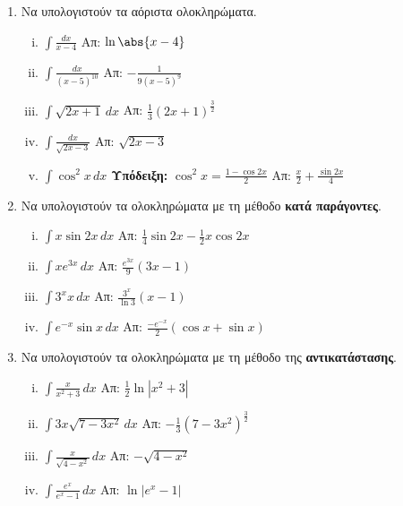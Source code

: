 \documentclass[a4paper,table]{report}
\begin{document}
\begin{center}
  \minibox{{\bfseries \large \textcolor{Col1}{Ασκήσεις στα Ολοκληρώματα}}}
\end{center}

\vspace{\baselineskip}


\begin{enumerate}
  \item Να υπολογιστούν τα αόριστα ολοκληρώματα.
    \begin{enumerate}[i)]
      \item $ \int \frac{dx}{x-4}$ \hfill Απ: $ \ln{\abs{x-4}} $ 
      \item $\int\frac{dx}{(x-5)^{10}} $ \hfill Απ: $-\frac{1}{9(x-5)^9}$
      \item $ \int \sqrt{ 2x+1 } \,{dx} $ \hfill Απ: 
        $ \frac{ 1 }{ 3 } (2x+1)^{\frac{ 3 }{ 2 } } $
      \item $ \int\frac{dx}{\sqrt{2x-3}}$ \hfill Απ: $ \sqrt{2x-3} $
      \item $\int\cos^2x \, dx$ \quad
        \textcolor{Col1}{\textbf{Υπόδειξη:}} $ \cos^{2}{x} = \frac{1- \cos{2x}}{2} $
        \hfill Απ: $\frac{x}{2} + \frac{\sin2x}{4}$
    \end{enumerate}

  \item Να υπολογιστούν τα ολοκληρώματα με τη μέθοδο \textbf{κατά παράγοντες}.
    \begin{enumerate}[i)]
      \item $\int x\sin2x \, dx$ \hfill Απ: $\frac{1}{4}\sin2x-\frac{1}{2}x\cos2x$
      \item $\int xe^{3x} \, dx$ \hfill Απ: $\frac{e^{3x}}{9}(3x-1)$
      \item $\int 3^{x}x \, dx$ \hfill Απ: $\frac{3^x}{\ln 3}(x-1)$
      \item $\int e^{-x}\sin x \, dx$ 
        \hfill Απ: $\frac{-e^{-x}}{2}(\cos x+\sin x)$
    \end{enumerate}

  \item Να υπολογιστούν τα ολοκληρώματα με τη μέθοδο της \textbf{αντικατάστασης}.
    \begin{enumerate}[i)]
      \item $\int\frac{x}{x^2+3} \, dx$ \hfill Απ: $\frac{1}{2}\ln|x^2+3|$
      \item $ \int 3x \sqrt{ 7-3x^{2} } \,{dx} $ 
        \hfill Απ: $ - \frac{1}{ 3 } (7-3x^{2})^{\frac{ 3 }{ 2 }} $
      \item $ \int \frac{x}{\sqrt{4-x^{2}}} \,{dx} $ \hfill Απ: $ - \sqrt{4-x^{2}} $ 
      \item $\int \frac{e^x}{e^x-1} \, dx$ \hfill Απ: $\ln|e^x-1|$
    \end{enumerate}


\end{enumerate}
\end{document}
